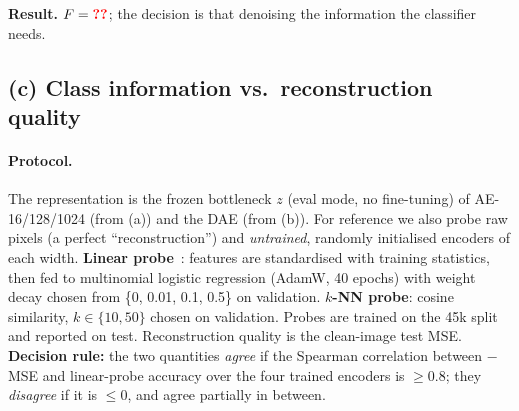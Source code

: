 \noindent\textbf{Result.} $F=\res{q3.F}$; the decision is that denoising \textbf{} the information the classifier needs.

\subsection{(c) Class information vs.\ reconstruction quality}
\paragraph{Protocol.} The representation is the frozen bottleneck $z$ (eval mode, no fine-tuning) of AE-16/128/1024 (from
(a)) and the DAE (from (b)). For reference we also probe raw pixels (a perfect ``reconstruction'') and \emph{untrained},
randomly initialised encoders of each width. \textbf{Linear probe}~\cite{alain2016understanding}: features are standardised
with training statistics, then fed to multinomial logistic regression (AdamW, 40 epochs) with weight decay chosen from \{0, 0.01, 0.1, 0.5\}
on validation. \textbf{$k$-NN probe}: cosine similarity, $k\in\{10,50\}$ chosen on validation. Probes are trained on the 45k
split and reported on test. Reconstruction quality is the clean-image test MSE. \textbf{Decision rule:} the two
quantities \emph{agree} if the Spearman correlation between $-$MSE and linear-probe accuracy over the four trained encoders is
$\geq0.8$; they \emph{disagree} if it is $\leq0$, and agree partially in between.

